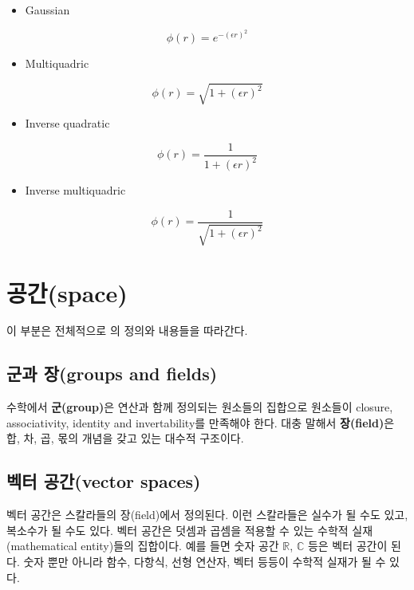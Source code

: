 \documentclass[b5paper,]{scrbook}
\providecommand{\tightlist}{%
  \setlength{\itemsep}{0pt}\setlength{\parskip}{0pt}}
\theoremstyle{plain}
\theoremstyle{definition}
\numberwithin{equation}{section}
\begin{document}
\begin{itemize}
\tightlist
\item
  Gaussian
\end{itemize}

\[\phi(r)=e^{-(\epsilon r)^{2}}\]

\begin{itemize}
\tightlist
\item
  Multiquadric
\end{itemize}

\[\phi(r)=\sqrt{1+(\epsilon r)^{2}}\]

\begin{itemize}
\tightlist
\item
  Inverse quadratic
\end{itemize}

\[\phi(r)=\frac{1}{1+(\epsilon r)^{2}}\]

\begin{itemize}
\tightlist
\item
  Inverse multiquadric
\end{itemize}

\[\phi(r)=\frac{1}{\sqrt{1+(\epsilon r)^{2}}}\]

\hypertarget{space}{%
\section{공간(space)}\label{space}}

이 부분은 전체적으로 \citep{Shima2016}의 정의와 내용들을 따라간다.

\hypertarget{-groups-and-fields}{%
\subsection{군과 장(groups and fields)}\label{-groups-and-fields}}

수학에서 \textbf{군(group)}은 연산과 함께 정의되는 원소들의 집합으로 원소들이 closure, associativity, identity and invertability를 만족해야 한다. 대충 말해서 \textbf{장(field)}은 합, 차, 곱, 몫의 개념을 갖고 있는 대수적 구조이다.

\hypertarget{-vector-spaces}{%
\subsection{벡터 공간(vector spaces)}\label{-vector-spaces}}

벡터 공간은 스칼라들의 장(field)에서 정의된다. 이런 스칼라들은 실수가 될 수도 있고, 복소수가 될 수도 있다. 벡터 공간은 덧셈과 곱셈을 적용할 수 있는 수학적 실재(mathematical entity)들의 집합이다. 예를 들면 숫자 공간 \(\mathbb{R}\), \(\mathbb{C}\) 등은 벡터 공간이 된다. 숫자 뿐만 아니라 함수, 다항식, 선형 연산자, 벡터 등등이 수학적 실재가 될 수 있다.
\end{document}
